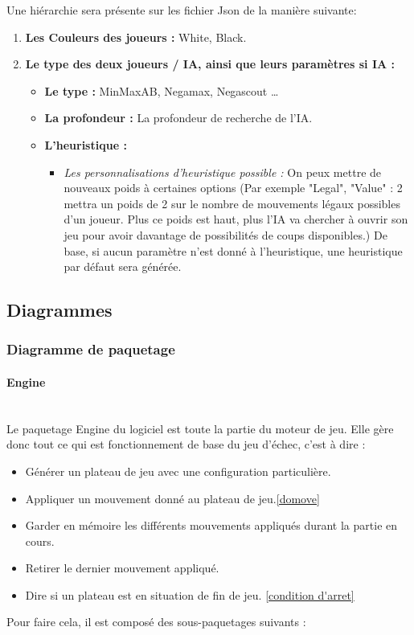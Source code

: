 \huge\documentclass{article}
\begin{document}
    Une hiérarchie sera présente sur les fichier Json de la manière suivante:
    \begin{enumerate}
        \item \textbf{Les Couleurs des joueurs :} White, Black.
        \item \textbf{Le type des deux joueurs / IA, ainsi que leurs paramètres si IA :}
        \begin{itemize}
            \item \textbf{Le type :} MinMaxAB, Negamax, Negascout \dots
            \item \textbf{La profondeur :} La profondeur de recherche de l'IA.
            \item \textbf{L'heuristique :}
            \begin{itemize}
                \item \textit{Les personnalisations d'heuristique possible :} On peux mettre de nouveaux poids à certaines options (Par exemple "Legal", "Value" :  2 mettra un poids de 2 sur le nombre de mouvements légaux possibles d'un joueur. Plus ce poids est haut, plus l'IA va chercher à ouvrir son jeu pour avoir davantage de possibilités de coups disponibles.)\newline
                De base, si aucun paramètre n'est donné à l'heuristique, une heuristique par défaut sera générée.
            \end{itemize}
        \end{itemize}

    \end{enumerate}
    \newpage
    \subsection{Diagrammes}
    \subsubsection{Diagramme de paquetage}
    \paragraph{Engine}
    ~~\\
    \newline
    Le paquetage Engine du logiciel est toute la partie du moteur de jeu.\newline
    Elle gère donc tout ce qui est fonctionnement de base du jeu d'échec, c'est à dire :
    \begin{itemize}
        \item Générer un plateau de jeu avec une configuration particulière.
        \item Appliquer un mouvement donné au plateau de jeu.\ref{domove}
        \item Garder en mémoire les différents mouvements appliqués durant la partie en cours.
        \item Retirer le dernier mouvement appliqué.
        \item Dire si un plateau est en situation de fin de jeu. \ref{condition d'arret}
    \end{itemize}
    Pour faire cela, il est composé des sous-paquetages suivants :
\end{document}
